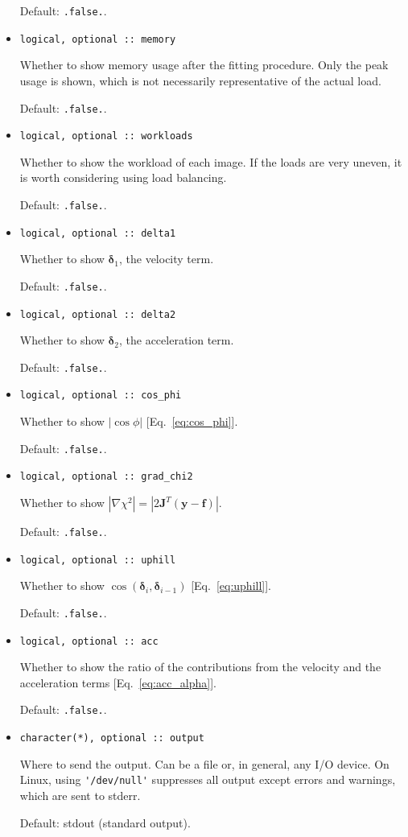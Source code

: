\documentclass{article}
\begin{document}
\begin{itemize}
  Default: \verb+.false.+.
\item
\begin{verbatim}
logical, optional :: memory
\end{verbatim}
  Whether to show memory usage after the fitting procedure. Only the peak usage is shown, which is not necessarily representative of the actual load.

  Default: \verb+.false.+.
\item
\begin{verbatim}
logical, optional :: workloads
\end{verbatim}
  Whether to show the workload of each image. If the loads are very uneven, it is worth considering using load balancing.

  Default: \verb+.false.+.
\item
\begin{verbatim}
logical, optional :: delta1
\end{verbatim}
  Whether to show $\bm\delta_1$, the velocity term.

  Default: \verb+.false.+.
\item
\begin{verbatim}
logical, optional :: delta2
\end{verbatim}
  Whether to show $\bm\delta_2$, the acceleration term.

  Default: \verb+.false.+.
\item
\begin{verbatim}
logical, optional :: cos_phi
\end{verbatim}
  Whether to show $|\cos\phi|$ [Eq.~\eqref{eq:cos_phi}].

  Default: \verb+.false.+.
\item
\begin{verbatim}
logical, optional :: grad_chi2
\end{verbatim}
  Whether to show $|\nabla \chi^2| = |2\bm J^T (\bm y - \bm f)|$.

  Default: \verb+.false.+.
\item
\begin{verbatim}
logical, optional :: uphill
\end{verbatim}
  Whether to show $\cos(\bm\delta_i,\bm\delta_{i-1})$
  [Eq.~\eqref{eq:uphill}].

  Default: \verb+.false.+.
\item
\begin{verbatim}
logical, optional :: acc
\end{verbatim}
  Whether to show the ratio of the contributions from the velocity and the acceleration terms [Eq.~\eqref{eq:acc_alpha}].

  Default: \verb+.false.+.
\item
\begin{verbatim}
character(*), optional :: output
\end{verbatim}
  Where to send the output. Can be a file or, in general, any I/O device. On Linux, using \verb+'/dev/null'+ suppresses all output except errors and warnings, which are sent to stderr.

  Default: stdout (standard output).
\end{itemize}
\end{document}

